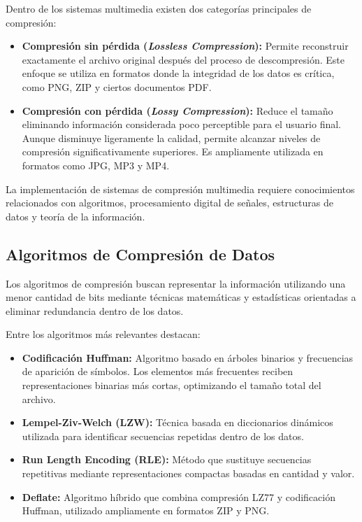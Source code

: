\documentclass[12pt, oneside, letterpaper]{book}
\begin{document}
Dentro de los sistemas multimedia existen dos categorías principales de compresión:

\begin{itemize}

\item \textbf{Compresión sin pérdida (\textit{Lossless Compression}):} Permite reconstruir exactamente el archivo original después del proceso de descompresión. Este enfoque se utiliza en formatos donde la integridad de los datos es crítica, como PNG, ZIP y ciertos documentos PDF.

\item \textbf{Compresión con pérdida (\textit{Lossy Compression}):} Reduce el tamaño eliminando información considerada poco perceptible para el usuario final. Aunque disminuye ligeramente la calidad, permite alcanzar niveles de compresión significativamente superiores. Es ampliamente utilizada en formatos como JPG, MP3 y MP4.
\end{itemize}

La implementación de sistemas de compresión multimedia requiere conocimientos relacionados con algoritmos, procesamiento digital de señales, estructuras de datos y teoría de la información.

\subsection{Algoritmos de Compresión de Datos}

Los algoritmos de compresión buscan representar la información utilizando una menor cantidad de bits mediante técnicas matemáticas y estadísticas orientadas a eliminar redundancia dentro de los datos.

Entre los algoritmos más relevantes destacan:

\begin{itemize}

\item \textbf{Codificación Huffman:} Algoritmo basado en árboles binarios y frecuencias de aparición de símbolos. Los elementos más frecuentes reciben representaciones binarias más cortas, optimizando el tamaño total del archivo.

\item \textbf{Lempel-Ziv-Welch (LZW):} Técnica basada en diccionarios dinámicos utilizada para identificar secuencias repetidas dentro de los datos.

\item \textbf{Run Length Encoding (RLE):} Método que sustituye secuencias repetitivas mediante representaciones compactas basadas en cantidad y valor.

\item \textbf{Deflate:} Algoritmo híbrido que combina compresión LZ77 y codificación Huffman, utilizado ampliamente en formatos ZIP y PNG.
\end{itemize}
\end{document}
